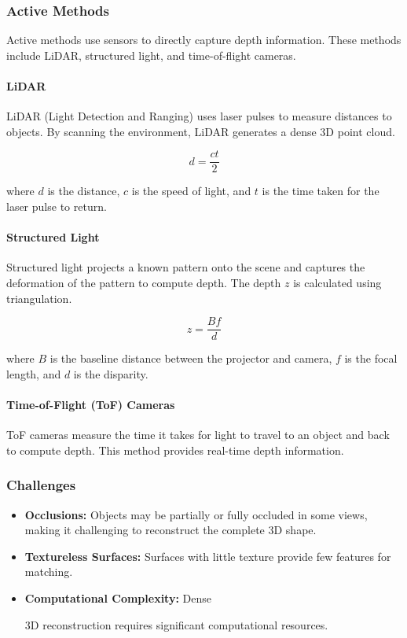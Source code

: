 \documentclass[12pt]{article}
\begin{document}
\subsubsection{Active Methods}

Active methods use sensors to directly capture depth information. These methods include LiDAR, structured light, and time-of-flight cameras.

\paragraph{LiDAR}

LiDAR (Light Detection and Ranging) uses laser pulses to measure distances to objects. By scanning the environment, LiDAR generates a dense 3D point cloud.

\[
d = \frac{ct}{2}
\]

where \( d \) is the distance, \( c \) is the speed of light, and \( t \) is the time taken for the laser pulse to return.

\paragraph{Structured Light}

Structured light projects a known pattern onto the scene and captures the deformation of the pattern to compute depth. The depth \( z \) is calculated using triangulation.

\[
z = \frac{B f}{d}
\]

where \( B \) is the baseline distance between the projector and camera, \( f \) is the focal length, and \( d \) is the disparity.

\paragraph{Time-of-Flight (ToF) Cameras}

ToF cameras measure the time it takes for light to travel to an object and back to compute depth. This method provides real-time depth information.

\subsubsection{Challenges}

\begin{itemize}
    \item \textbf{Occlusions:} Objects may be partially or fully occluded in some views, making it challenging to reconstruct the complete 3D shape.
    \item \textbf{Textureless Surfaces:} Surfaces with little texture provide few features for matching.
    \item \textbf{Computational Complexity:} Dense 

3D reconstruction requires significant computational resources.
\end{itemize}
\end{document}
